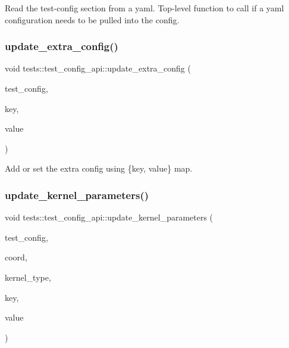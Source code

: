 Read the test-\/config section from a yaml. Top-\/level function to call if a yaml configuration needs to be pulled into the config. 

\mbox{\label{namespacetests_1_1test__config__api_a6907c47ab33d9fc64929313ace78cd37}} 
\subsubsection{\texorpdfstring{update\+\_\+extra\+\_\+config()}{update\_extra\_config()}}
{\footnotesize\ttfamily void tests\+::test\+\_\+config\+\_\+api\+::update\+\_\+extra\+\_\+config (\begin{DoxyParamCaption}\item[{\hyperlink{structtests_1_1TestConfig}{Test\+Config} \&}]{test\+\_\+config,  }\item[{std\+::string}]{key,  }\item[{std\+::string}]{value }\end{DoxyParamCaption})}



Add or set the extra config using \{key, value\} map. 

\mbox{\label{namespacetests_1_1test__config__api_a056c9a76c1c2ac345492adad043a41f1}} 
\subsubsection{\texorpdfstring{update\+\_\+kernel\+\_\+parameters()}{update\_kernel\_parameters()}\hspace{0.1cm}{\footnotesize\ttfamily [1/3]}}
{\footnotesize\ttfamily void tests\+::test\+\_\+config\+\_\+api\+::update\+\_\+kernel\+\_\+parameters (\begin{DoxyParamCaption}\item[{\hyperlink{structtests_1_1TestConfig}{Test\+Config} \&}]{test\+\_\+config,  }\item[{\hyperlink{structllk_1_1xy__pair}{llk\+::xy\+\_\+pair}}]{coord,  }\item[{\hyperlink{namespacetests_a4f360b8af533762256ff97513bfd6a0d}{tests\+::\+Kernel\+Type}}]{kernel\+\_\+type,  }\item[{std\+::string}]{key,  }\item[{std\+::string}]{value }\end{DoxyParamCaption})}



